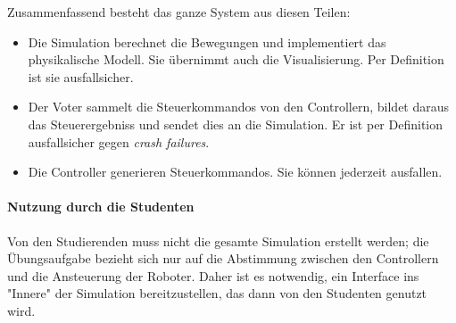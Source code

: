 Zusammenfassend besteht das ganze System aus diesen Teilen:
\begin{itemize}
	\item Die Simulation berechnet die Bewegungen und implementiert das physikalische Modell. Sie {\"{u}}bernimmt auch die Visualisierung. Per Definition ist sie ausfallsicher.
	\item Der Voter sammelt die Steuerkommandos von den Controllern, bildet daraus das Steuerergebniss und sendet dies an die Simulation. Er ist per Definition ausfallsicher gegen \textit{crash failures}.
	\item Die Controller generieren Steuerkommandos. Sie k{\"{o}}nnen jederzeit ausfallen.
\end{itemize}

\paragraph{Nutzung durch die Studenten} Von den Studierenden muss nicht die gesamte Simulation erstellt werden; die {\"{U}}bungsaufgabe bezieht sich nur auf die Abstimmung zwischen den Controllern und die Ansteuerung der Roboter.
Daher ist es notwendig, ein Interface ins "Innere" der Simulation bereitzustellen, das dann von den Studenten genutzt wird.
